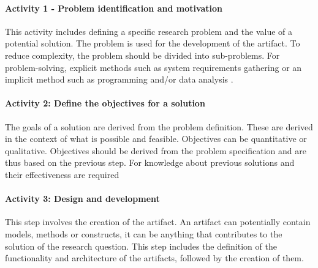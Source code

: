 

\paragraph{Activity 1 - Problem identification and motivation}
This activity includes defining a specific research problem and the value of a potential solution.
The problem is used for the development of the artifact.
To reduce complexity, the problem should be divided into sub-problems.
For problem-solving, explicit methods such as system requirements
gathering or an implicit method such as programming and/or data analysis
\cite[p. 52]{peffers_designscienceresearch_2007}.



\paragraph{Activity 2: Define the objectives for a solution}
The goals of a solution are derived from the problem definition. These are derived in the context
of what is possible and feasible.
Objectives can be quantitative or qualitative. Objectives should be derived from the
problem specification and are thus based on the previous step.
For knowledge about previous solutions and their effectiveness are required
\cite[p. 55]{peffers_designscienceresearch_2007}

\paragraph{Activity 3: Design and development}
This step involves the creation of the artifact. An artifact can potentially contain models,
methods or constructs, it can be anything that contributes to the solution of the research question.
This step includes the definition of the functionality and architecture of the artifacts,
followed by the creation of them.
\cite[p. 55]{peffers_designscienceresearch_2007}

